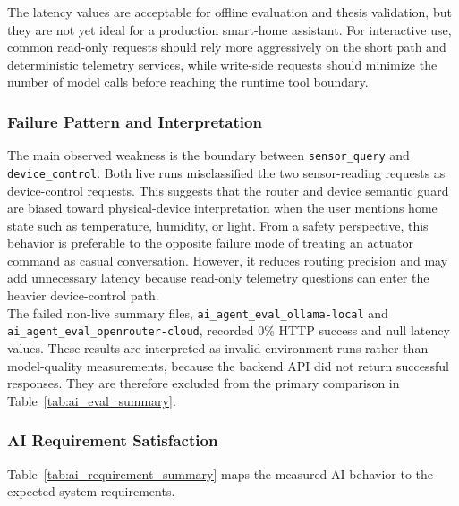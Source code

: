 The latency values are acceptable for offline evaluation and thesis validation, but they are not yet ideal for a production smart-home assistant. For interactive use, common read-only requests should rely more aggressively on the short path and deterministic telemetry services, while write-side requests should minimize the number of model calls before reaching the runtime tool boundary.

\subsubsection{Failure Pattern and Interpretation}

The main observed weakness is the boundary between \texttt{sensor\_query} and \texttt{device\_control}. Both live runs misclassified the two sensor-reading requests as device-control requests. This suggests that the router and device semantic guard are biased toward physical-device interpretation when the user mentions home state such as temperature, humidity, or light. From a safety perspective, this behavior is preferable to the opposite failure mode of treating an actuator command as casual conversation. However, it reduces routing precision and may add unnecessary latency because read-only telemetry questions can enter the heavier device-control path. \\

The failed non-live summary files, \texttt{ai\_agent\_eval\_ollama-local} and \texttt{ai\_agent\_eval\_openrouter-cloud}, recorded 0\% HTTP success and null latency values. These results are interpreted as invalid environment runs rather than model-quality measurements, because the backend API did not return successful responses. They are therefore excluded from the primary comparison in Table~\ref{tab:ai_eval_summary}.

\subsubsection{AI Requirement Satisfaction}

Table~\ref{tab:ai_requirement_summary} maps the measured AI behavior to the expected system requirements.

